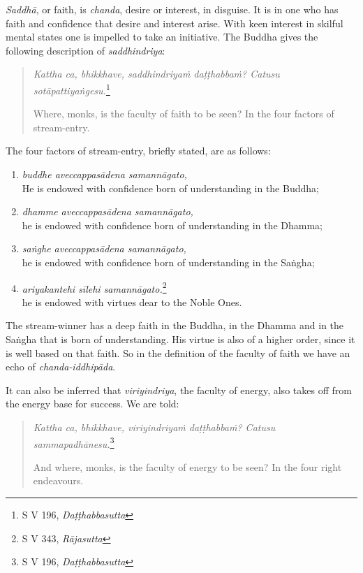\emph{Saddhā}, or faith, is \emph{chanda}, desire or interest, in disguise. It is in one who has faith and confidence that desire and interest arise. With keen interest in skilful mental states one is impelled to take an initiative. The Buddha gives the following description of \emph{saddhindriya}:

\begin{quote}
\emph{Kattha ca, bhikkhave, saddhindriyaṁ daṭṭhabbaṁ? Catusu sotāpattiyaṅgesu.}\footnote{S V 196, \emph{Daṭṭhabbasutta}}

Where, monks, is the faculty of faith to be seen? In the four factors of stream-entry.
\end{quote}

The four factors of stream-entry, briefly stated, are as follows:

\begin{enumerate}
\def\labelenumi{\arabic{enumi}.}
\tightlist
\item
  \emph{buddhe aveccappasādena samannāgato,}\\
  He is endowed with confidence born of understanding in the Buddha;
\item
  \emph{dhamme aveccappasādena samannāgato,}\\
  he is endowed with confidence born of understanding in the Dhamma;
\item
  \emph{saṅghe aveccappasādena samannāgato,}\\
  he is endowed with confidence born of understanding in the Saṅgha;
\item
  \emph{ariyakantehi sīlehi samannāgato.}\footnote{S V 343, \emph{Rājasutta}}\\
  he is endowed with virtues dear to the Noble Ones.
\end{enumerate}

The stream-winner has a deep faith in the Buddha, in the Dhamma and in the Saṅgha that is born of understanding. His virtue is also of a higher order, since it is well based on that faith. So in the definition of the faculty of faith we have an echo of \emph{chanda-iddhipāda}.

It can also be inferred that \emph{viriyindriya}, the faculty of energy, also takes off from the energy base for success. We are told:

\begin{quote}
\emph{Kattha ca, bhikkhave, viriyindriyaṁ daṭṭhabbaṁ? Catusu sammapadhānesu.}\footnote{S V 196, \emph{Daṭṭhabbasutta}}

And where, monks, is the faculty of energy to be seen? In the four right endeavours.
\end{quote}

